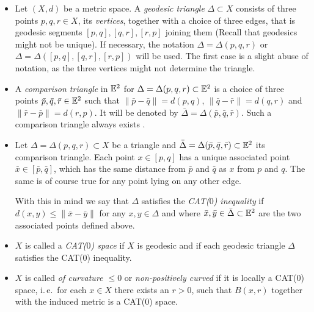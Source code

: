 
\begin{defin}
  \label{def:cat}
  \begin{itemize}
  \item Let \((X,d)\) be a metric space. A \emph{geodesic triangle} \(\Delta \subset X\) consists of three points \(p,q,r \in X\), its \emph{vertices}, together with a choice of three edges, that is geodesic segments \([p,q], [q,r], [r, p]\) joining them (Recall that geodesics might not be unique). If necessary, the notation \(\Delta = \Delta(p,q,r)\) or \(\Delta = \Delta([p,q], [q,r], [r,p])\) will be used. The first case is a slight abuse of notation, as the three vertices might not determine the triangle.
  \item A \emph{comparison triangle} in \(\mathbb{E}^2\) for \(\Delta = \Delta(p,q,r) \subset \mathbb{E}^2\) is a choice of three points \(\bar p, \bar q, \bar r \in \mathbb{E}^2\) such that \(\|\bar p- \bar q\| = d(p, q)\), \(\|\bar q- \bar r\| = d(q, r)\) and \(\|\bar r- \bar p\| = d(r, p)\). It will be denoted by \(\bar \Delta = \Delta(\bar p, \bar q, \bar r)\). Such a comparison triangle always exists \cite[c.\,f.][Sec.\ I.2]{MR1744486}.
  \item Let \(\Delta = \Delta(p,q,r) \subset X\) be a triangle and \(\bar \Delta = \Delta(\bar p, \bar q, \bar r) \subset \mathbb{E}^2\) its comparison triangle. Each point \(x \in [p,q]\) has a unique associated point \(\bar x \in [\bar p, \bar q]\), which has the same distance from \(\bar p\) and \(\bar q\) as \(x\) from \(p\) and \(q\). The same is of course true for any point lying on any other edge.

    With this in mind we say that \(\Delta\) satisfies the \emph{CAT(\(0\)) inequality} if \(d(x,y) \leq \|\bar x- \bar y\|\) for any \(x, y \in \Delta\) and where \(\bar x, \bar y \in \bar \Delta \subset \mathbb{E}^2\) are the two associated points defined above.
  \item \(X\) is called a \emph{CAT(\(0\)) space} if \(X\) is geodesic and if each geodesic triangle \(\Delta\) satisfies the CAT(\(0\)) inequality.
  \item \(X\) is called \emph{of curvature \(\leq 0\)} or \emph{non-positively curved} if it is locally a CAT(\(0\)) space, i.\,e.\ for each \(x \in X\) there exists an \(r > 0\), such that \(B(x,r)\) together with the induced metric is a CAT(\(0\)) space.
  \end{itemize}
\end{defin}

